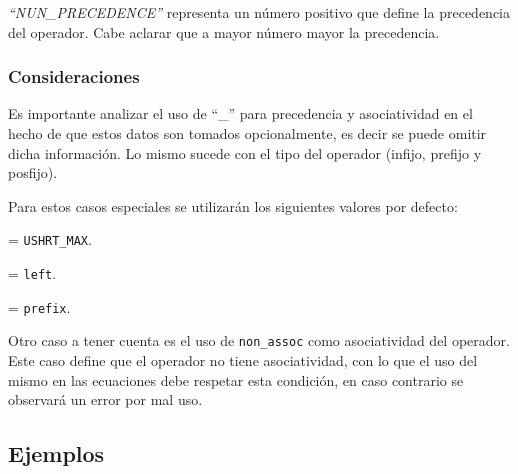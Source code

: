 \textit{``NUN\_PRECEDENCE''} representa un número positivo que define la precedencia del operador. Cabe aclarar que a mayor número mayor la precedencia.

\subsubsection*{Consideraciones}

Es importante analizar el uso de ``\_'' para precedencia y asociatividad en el hecho de que estos datos son tomados opcionalmente, es decir se puede omitir dicha información. Lo mismo sucede con el tipo del operador (infijo, prefijo y posfijo). 

Para estos casos especiales se utilizarán los siguientes valores por defecto:

\begin{description}
\label{desc:default}
\item [Precedencia] = \texttt{USHRT\_MAX}.

\item [Asociatividad] = \texttt{left}.

\item [Tipo de operador] = \texttt{prefix}.
\end{description}

Otro caso a tener cuenta es el uso de \texttt{non\_assoc} como asociatividad del operador. Este caso define que el operador no tiene asociatividad, con lo que el uso del mismo en las ecuaciones debe respetar esta condición, en caso contrario se observará un error por mal uso.
\subsection*{Ejemplos}

